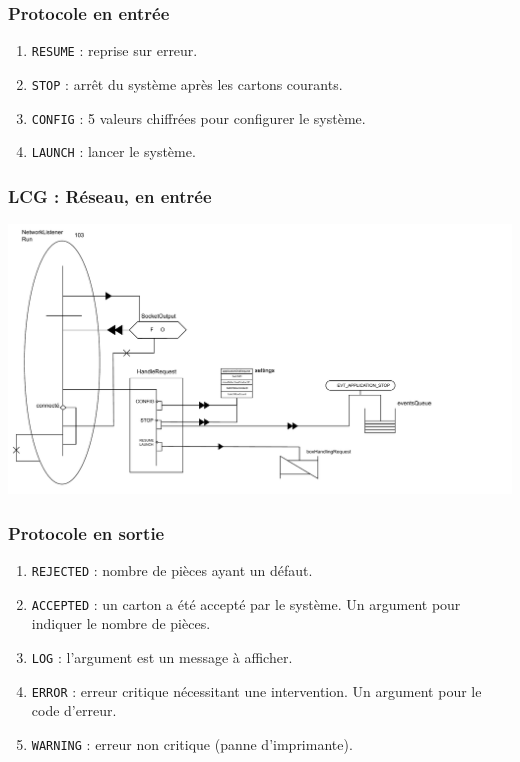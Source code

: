 \documentclass{beamer}
\begin{document}
\begin{frame}
\frametitle{Protocole en entrée}
\begin{enumerate}
		\item \texttt{RESUME} : reprise sur erreur.
		\item \texttt{STOP} : arrêt du système après les cartons courants.
		\item \texttt{CONFIG} : 5 valeurs chiffrées pour configurer le système.
		\item \texttt{LAUNCH} : lancer le système.
\end{enumerate}
\end{frame}

\begin{frame}
    \frametitle{LCG : Réseau, en entrée}
    \includegraphics[width=\textwidth]{../SchemasLCG/NetworkListener-run.pdf}
\end{frame}

\begin{frame}
\frametitle{Protocole en sortie}
    \begin{enumerate}
		\item \texttt{REJECTED} : nombre de pièces ayant un défaut.
		\item \texttt{ACCEPTED} : un carton a été accepté par le système. Un argument pour indiquer le nombre de pièces.
		\item \texttt{LOG} : l'argument est un message à afficher.
		\item \texttt{ERROR} : erreur critique nécessitant une intervention. Un argument pour le code d'erreur.
		\item \texttt{WARNING} : erreur non critique (panne d'imprimante).
    \end{enumerate}
\end{frame}
\end{document}
